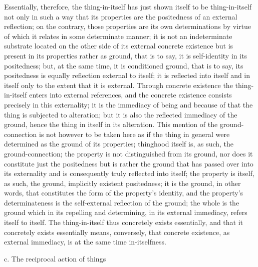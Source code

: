 Essentially, therefore, the thing-in-itself has
just shown itself to be thing-in-itself
not only in such a way that its properties are
the positedness of an external reflection;
on the contrary, those properties are its own determinations
by virtue of which it relates in some determinate manner;
it is not an indeterminate substrate located on
the other side of its external concrete existence
but is present in its properties rather as ground,
that is to say, it is self-identity in its positedness;
but, at the same time, it is conditioned ground,
that is to say, its positedness is
equally reflection external to itself;
it is reflected into itself and in itself
only to the extent that it is external.
Through concrete existence the thing-in-itself
enters into external references,
and the concrete existence consists
precisely in this externality;
it is the immediacy of being
and because of that the thing is
subjected to alteration;
but it is also the reflected immediacy of the ground,
hence the thing in itself in its alteration.
This mention of the ground-connection is
not however to be taken here as if
the thing in general were determined
as the ground of its properties;
thinghood itself is, as such, the ground-connection;
the property is not distinguished from its ground,
nor does it constitute just the positedness
but is rather the ground that has
passed over into its externality
and is consequently truly reflected into itself;
the property is itself, as such,
the ground, implicitly existent positedness;
it is the ground, in other words,
that constitutes the form of the property's identity,
and the property's determinateness is
the self-external reflection of the ground;
the whole is the ground which in its repelling and determining,
in its external immediacy, refers itself to itself.
The thing-in-itself thus concretely exists essentially,
and that it concretely exists essentially means,
conversely, that concrete existence, as external immediacy,
is at the same time in-itselfness.

c. The reciprocal action of things

